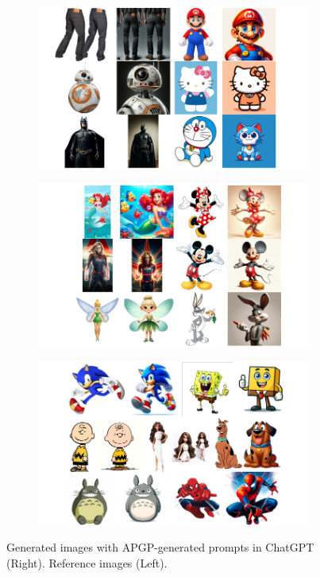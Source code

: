\begin{figure}[ht]
    \centering
    \begin{subfigure}[t]{0.85\linewidth}
        \includegraphics[width=0.99\textwidth]{figure_folder/6.png}
    \end{subfigure}
    \hfill
    \begin{subfigure}[t]{0.85\linewidth}
        \includegraphics[width=0.99\textwidth]{figure_folder/7.png}
    \end{subfigure}
    \begin{subfigure}[t]{0.85\linewidth}
        \includegraphics[width=0.99\textwidth]{figure_folder/8.png}
  
    \end{subfigure}
    \caption{Generated images with APGP-generated prompts in ChatGPT (Right). Reference images (Left).}
    \label{app:final_output3}
\end{figure}

